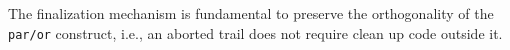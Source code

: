 \documentclass[letterpaper]{sig-alternate}
\newcommand{\code}[1] {{\small{\texttt{#1}}}}
\begin{document}


The finalization mechanism is fundamental to preserve the orthogonality of the
\code{par/or} construct, i.e., an aborted trail does not require clean up code 
outside it.

\end{document}
